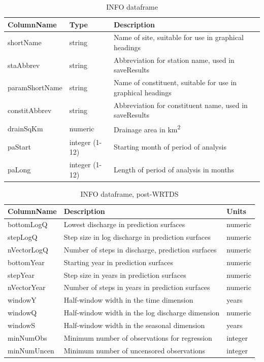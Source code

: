 \documentclass[a4paper,11pt]{article}\usepackage[]{graphicx}\usepackage[]{color}
\begin{document}
\begin{table}[!ht]
\begin{minipage}{\linewidth}
\begin{center}
\caption{INFO dataframe}
\label{table:Info1}
\begin{tabular}{lll}
  \hline
ColumnName & Type & Description \\ 
  \hline
  shortName & string & Name of site, suitable for use in graphical headings \\ 
  staAbbrev & string & Abbreviation for station name, used in saveResults \\ 
  paramShortName & string & Name of constituent, suitable for use in graphical headings \\ 
  constitAbbrev & string & Abbreviation for constituent name, used in saveResults \\ 
  drainSqKm & numeric & Drainage area in  km\textsuperscript{2} \\ 
  paStart \footnotemark[1] & integer (1-12) & Starting month of period of analysis \\ 
  paLong \footnotemark[1] & integer (1-12) & Length of period of analysis in months \\ 
   \hline
\end{tabular}
\end{center}
\end{minipage}
\end{table}


\begin{table}[!ht]
\centering
\caption{INFO dataframe, post-WRTDS} 
\label{table:Info2}
\begin{tabular}{lll}
  \hline
ColumnName & Description & Units \\ 
  \hline
bottomLogQ & Lowest discharge in prediction surfaces & numeric \\ 
  stepLogQ & Step size in log discharge in prediction surfaces & numeric \\ 
  nVectorLogQ & Number of steps in discharge, prediction surfaces & numeric \\ 
  bottomYear & Starting year in prediction surfaces & numeric \\ 
  stepYear & Step size in years in prediction surfaces & numeric \\ 
  nVectorYear & Number of steps in years in prediction surfaces & numeric \\ 
  windowY & Half-window width in the time dimension & years \\ 
  windowQ & Half-window width in the log discharge dimension & numeric \\ 
  windowS & Half-window width in the seasonal dimension & years \\ 
  minNumObs & Minimum number of observations for regression & integer \\ 
  minNumUncen & Minimum number of uncensored observations & integer \\ 
   \hline
\end{tabular}
\end{table}
\end{document}

